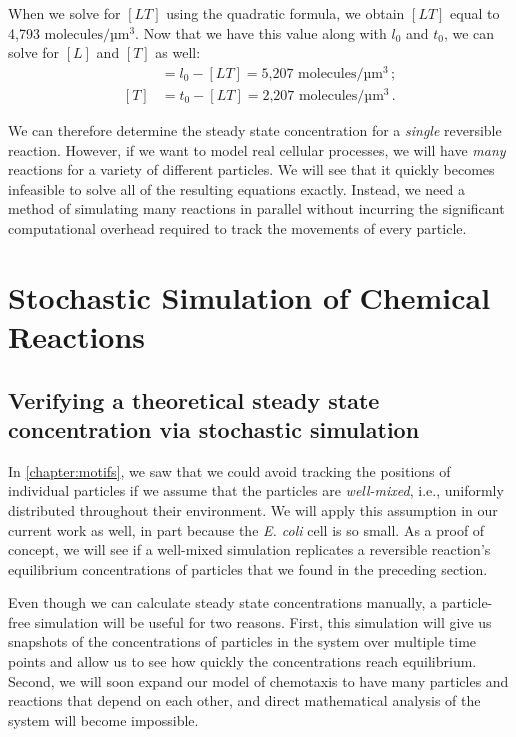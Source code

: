 When we solve for $[LT]$ using the quadratic formula, we obtain $[LT]$ equal to 4,793 $\text{molecules}/\text{µm}^3$. Now that we have this value along with $l_0$ and $t_0$, we can solve for $[L]$ and $[T]$ as well:
\begin{align*}
[L] & = l_0 - [LT] = \text{5,207 molecules}/\text{µm}^3\,;\\
[T] & = t_0 - [LT] = \text{2,207 molecules}/\text{µm}^3\,.
\end{align*}

We can therefore determine the steady state concentration for a \textit{single} reversible reaction. However, if we want to model real cellular processes, we will have \textit{many} reactions for a variety of different particles. We will see that it quickly becomes infeasible to solve all of the resulting equations exactly. Instead, we need a method of simulating many reactions in parallel without incurring the significant computational overhead required to track the movements of every particle.\\

\FloatBarrier
{}

\section{Stochastic Simulation of Chemical Reactions}
\label{sec:stochastic_simulation_of_chemical_reactions}
\subsection{Verifying a theoretical steady state concentration via stochastic simulation}

In \autoref{chapter:motifs}, we saw that we could avoid tracking the positions of individual particles if we assume that the particles are \textit{well-mixed}, i.e., uniformly distributed throughout their environment. We will apply this assumption in our current work as well, in part because the \textit{E. coli} cell is so small. As a proof of concept, we will see if a well-mixed simulation replicates a reversible reaction's equilibrium concentrations of particles that we found in the preceding section.

Even though we can calculate steady state concentrations manually, a particle-free simulation will be useful for two reasons. First, this simulation will give us snapshots of the concentrations of particles in the system over multiple time points and allow us to see how quickly the concentrations reach equilibrium. Second, we will soon expand our model of chemotaxis to have many particles and reactions that depend on each other, and direct mathematical analysis of the system will become impossible.\\

